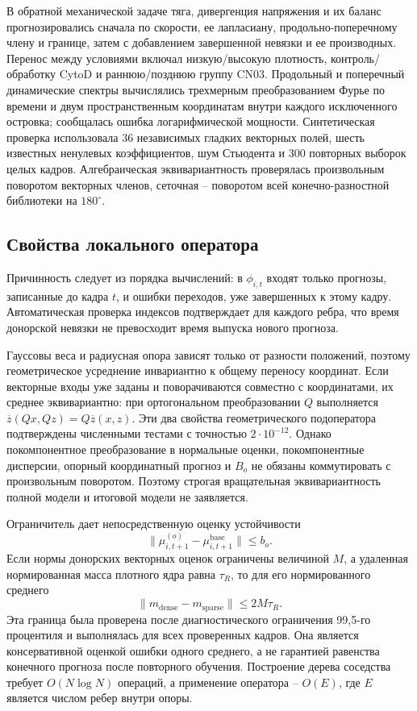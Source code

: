\documentclass[11pt,a4paper]{article}
\begin{document}
В обратной механической задаче тяга, дивергенция напряжения и их баланс прогнозировались сначала по скорости, ее лапласиану, продольно-поперечному члену и границе, затем с добавлением завершенной невязки и ее производных. Перенос между условиями включал низкую/высокую плотность, контроль/обработку CytoD и раннюю/позднюю группу CN03. Продольный и поперечный динамические спектры вычислялись трехмерным преобразованием Фурье по времени и двум пространственным координатам внутри каждого исключенного островка; сообщалась ошибка логарифмической мощности. Синтетическая проверка использовала 36 независимых гладких векторных полей, шесть известных ненулевых коэффициентов, шум Стьюдента и 300 повторных выборок целых кадров. Алгебраическая эквивариантность проверялась произвольным поворотом векторных членов, сеточная -- поворотом всей конечно-разностной библиотеки на $180^\circ$.

\subsection{Свойства локального оператора}
Причинность следует из порядка вычислений: в $\phi_{i,t}$ входят только прогнозы, записанные до кадра $t$, и ошибки переходов, уже завершенных к этому кадру. Автоматическая проверка индексов подтверждает для каждого ребра, что время донорской невязки не превосходит время выпуска нового прогноза.

Гауссовы веса и радиусная опора зависят только от разности положений, поэтому геометрическое усреднение инвариантно к общему переносу координат. Если векторные входы уже заданы и поворачиваются совместно с координатами, их среднее эквивариантно: при ортогональном преобразовании $Q$ выполняется $\overline z(Qx,Qz)=Q\overline z(x,z)$. Эти два свойства геометрического подоператора подтверждены численными тестами с точностью $2\cdot10^{-12}$. Однако покомпонентное преобразование в нормальные оценки, покомпонентные дисперсии, опорный координатный прогноз и $B_o$ не обязаны коммутировать с произвольным поворотом. Поэтому строгая вращательная эквивариантность полной модели и итоговой модели не заявляется.

Ограничитель дает непосредственную оценку устойчивости
\begin{equation}
\|\mu^{(o)}_{i,t+1}-\mu^{\mathrm{base}}_{i,t+1}\|\le b_o.
\end{equation}
Если нормы донорских векторных оценок ограничены величиной $M$, а удаленная нормированная масса плотного ядра равна $\tau_R$, то для его нормированного среднего
\begin{equation}
\|m_{\mathrm{dense}}-m_{\mathrm{sparse}}\|\le 2M\tau_R.
\end{equation}
Эта граница была проверена после диагностического ограничения 99,5-го процентиля и выполнялась для всех проверенных кадров. Она является консервативной оценкой ошибки одного среднего, а не гарантией равенства конечного прогноза после повторного обучения. Построение дерева соседства требует $O(N\log N)$ операций, а применение оператора -- $O(E)$, где $E$ является числом ребер внутри опоры.
\end{document}
